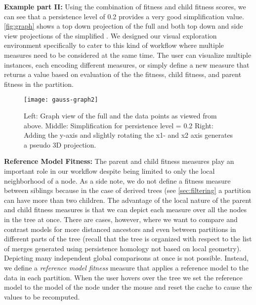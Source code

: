 \textbf{Example part II:}
Using the combination of fitness and child fitness scores, we can see that a persistence level of 0.2 provides a very good simplification value. \autoref{fig:graph} shows a top down projection of the full \MSC and both top down and side view projections of the simplified \MSC.  We designed our visual exploration environment specifically to cater to this kind of workflow where multiple measures need to be considered at the same time. The user can visualize multiple \RT instances, each encoding different measures, or simply define a new measure that returns a value based on evaluation of the the fitness, child fitness, and parent fitness in the partition.

\begin{figure}[bt]
    \begin{center}
     \texttt{[image: gauss-graph2]}
    \caption{Left: Graph view of the full \MSC and the data points as viewed from above. Middle: Simplification for persistence level = 0.2 Right: Adding the y-axis and slightly rotating the x1- and x2 axis generates a pseudo 3D projection.}
    \label{fig:graph}
    \end{center}
    \vspace{-0.15in}
\end{figure}

\textbf{Reference Model Fitness:}
The parent and child fitness measures play an important role in our workflow despite being limited to only the local neighborhood of a node. As a side note, we do not define a fitness measure between siblings because in the case of derived trees (see \autoref{sec:filtering} a partition can have more than two children. The advantage of the local nature of the parent and child fitness measures is that we can depict each measure over all the nodes in the tree at once. There are cases, however, where we want to compare and contrast models for more distanced ancestors and even between partitions in different parts of the tree (recall that the tree is organized with respect to the list of merges generated using persistence homology not based on local geometry). Depicting many independent global comparisons at once is not possible. Instead, we define a \textit{reference model fitness} measure that applies a reference model to the data in each partition. When the user hovers over the tree we set the reference model to the model of the node under the mouse and reset the cache to cause the values to be recomputed.


